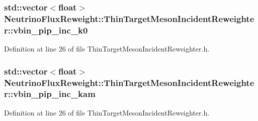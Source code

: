 \hypertarget{class_neutrino_flux_reweight_1_1_thin_target_meson_incident_reweighter_a4dc56ba2cd4aefe825f48334dc9fd570}{
\subsubsection[{vbin\-\_\-pip\-\_\-inc\-\_\-k0}]{\setlength{\rightskip}{0pt plus 5cm}std\-::vector$<$float$>$ Neutrino\-Flux\-Reweight\-::\-Thin\-Target\-Meson\-Incident\-Reweighter\-::vbin\-\_\-pip\-\_\-inc\-\_\-k0}}\label{class_neutrino_flux_reweight_1_1_thin_target_meson_incident_reweighter_a4dc56ba2cd4aefe825f48334dc9fd570}


Definition at line 26 of file Thin\-Target\-Meson\-Incident\-Reweighter.\-h.

\hypertarget{class_neutrino_flux_reweight_1_1_thin_target_meson_incident_reweighter_a4b9a6dea5fa9006465b9869f7f5a7ef4}{
\subsubsection[{vbin\-\_\-pip\-\_\-inc\-\_\-kam}]{\setlength{\rightskip}{0pt plus 5cm}std\-::vector$<$float$>$ Neutrino\-Flux\-Reweight\-::\-Thin\-Target\-Meson\-Incident\-Reweighter\-::vbin\-\_\-pip\-\_\-inc\-\_\-kam}}\label{class_neutrino_flux_reweight_1_1_thin_target_meson_incident_reweighter_a4b9a6dea5fa9006465b9869f7f5a7ef4}


Definition at line 26 of file Thin\-Target\-Meson\-Incident\-Reweighter.\-h.

